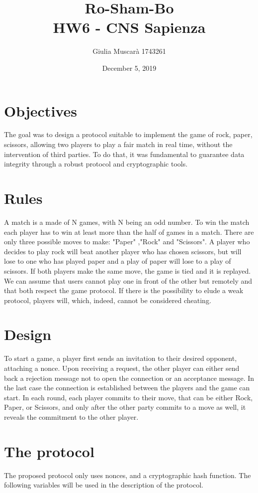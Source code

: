\documentclass[11 pt]{article}
\title{
	Ro-Sham-Bo \\
	\large HW6 - CNS Sapienza}
\author{Giulia Muscarà 1743261}
\date{December 5, 2019}
\begin{document}
\maketitle

\section{Objectives}
The goal was to design a protocol suitable to implement the game of rock, paper, scissors, allowing two players to play a fair match in real time, without the intervention of third parties. To do that, it was fundamental to guarantee data integrity through a robust protocol and cryptographic tools.

\section{Rules}
A match is a made of N games, with N being an odd number. To win the match each player has to win at least more than the half of games in a match. There are only three possible moves to make: "Paper" ,"Rock" and "Scissors". A player who decides to play rock will beat another player who has chosen scissors, but will lose to one who has played paper and a play of paper will lose to a play of scissors. If both players make the same move, the game is tied and it is replayed. We can assume that users cannot play one in front of the other but remotely and that both respect the game protocol. If there is the possibility to elude a weak protocol, players will, which, indeed, cannot be considered cheating.

\section{Design}
To start a game, a player first sends an invitation to their desired opponent, attaching a nonce. Upon receiving a request, the other player can either send back a rejection message not to open the connection or an acceptance message. In the last case the connection is established between the players and the game can start. In each round, each player commits to
their move, that can be either Rock, Paper, or Scissors, and only after the other party commits to a move as well, it reveals the commitment to the other player.

\section{The protocol}
The proposed protocol only uses nonces, and a cryptographic hash function. The following variables will be used in the description of the protocol.
\end{document}
